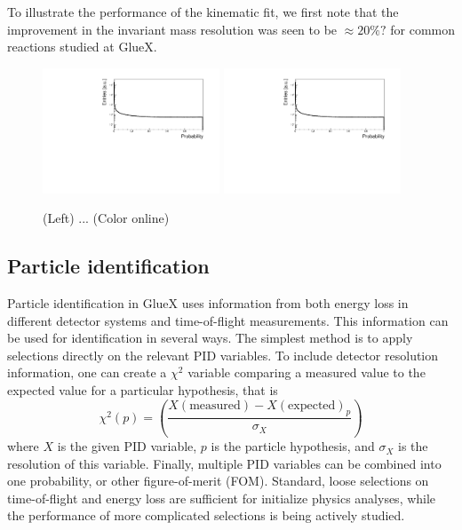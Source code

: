 To illustrate the performance of the kinematic fit, we first note that the improvement in the invariant mass resolution was seen to be $\approx20\%?$ for common reactions studied at GlueX. 

\begin{figure}[tbp]
\begin{center}
\includegraphics[width=0.47\textwidth]{figures/eta_KFit_Prob.pdf}
\includegraphics[width=0.47\textwidth]{figures/eta_KFit_Prob.pdf}
\caption{\label{fig:kinfitperform}
(Left) ...
 (Color online)}
\end{center}
\end{figure}

\subsection{Particle identification \label{sec:perfpid}}

Particle identification in GlueX uses information from both energy loss in different detector systems and time-of-flight measurements.  This information can be used for identification in several ways.  The simplest method is to apply selections directly on the relevant PID variables.  To include detector resolution information, one can create a $\chi^2$ variable comparing a measured value to the expected value for a particular hypothesis, that is
\begin{equation}
    \chi^2(p) = \left(  \frac{ X(\mathrm{measured}) - X(\mathrm{expected})_p}{\sigma_X} \right)
\end{equation}
where $X$ is the given PID variable, $p$ is the particle hypothesis, and $\sigma_X$ is the resolution of this variable.  Finally, multiple PID variables can be combined into one probability, or other figure-of-merit (FOM).   Standard, loose selections on time-of-flight and energy loss are sufficient for initialize physics analyses, while the performance of more complicated selections is being actively studied.

